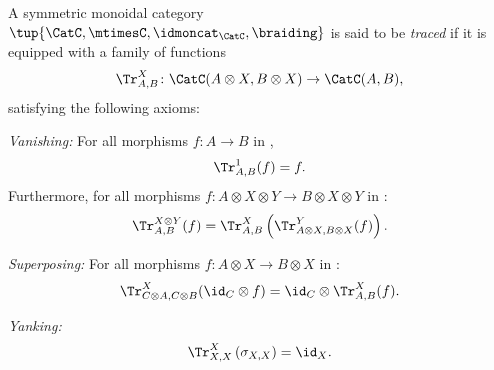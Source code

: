 \begin{ctdefinition}
  \label{def:traced-monoidal-category}
  A symmetric monoidal category $\tup{\CatC,\mtimesC,\idmoncat_{\CatC}, \braiding}$ is said to be \emph{traced} if it is equipped with a family of functions
  \begin{equation}
    \Tr_{A,B}^X\colon \CatC(A\otimes X, B\otimes X)\to \CatC(A,B),
  \end{equation}
  satisfying the following axioms:
  \begin{compactenum}
    \item \emph{Vanishing:} For all morphisms $f\colon A\to B$ in \CatC,
    \begin{equation}
      \label{eq:vanishing_1}
      \Tr_{A,B}^1(f)=f.
    \end{equation}
    Furthermore, for all morphisms $f\colon A\otimes X \otimes Y \to B\otimes X \otimes Y$ in \CatC:
    \begin{equation}
      \label{eq:vanishing_2}
      \Tr_{A,B}^{X\otimes Y}(f)=\Tr_{A,B}^X\left(
      \Tr_{A\otimes X,B\otimes X}^Y(f)\right).
    \end{equation}
    \item \emph{Superposing:} For all morphisms $f\colon A\otimes X\to B\otimes X$ in \CatC:
    \begin{equation}
      \label{eq:superposing}
      \Tr_{C\otimes A,C\otimes B}^{X}(\id_C\otimes f)=\id_C\otimes \Tr_{A,B}^X(f).
    \end{equation}
    \item \emph{Yanking:}
    \begin{equation}
      \label{eq:yanking}
      \Tr_{X,X}^X\left(\sigma_{X,X}\right)=\id_X.
    \end{equation}
  \end{compactenum}
\end{ctdefinition}
